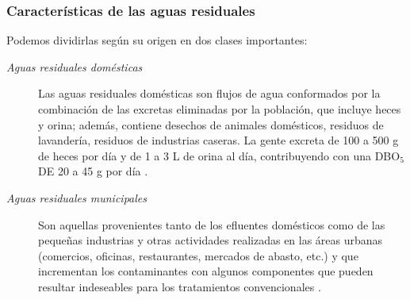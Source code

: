 \subsubsection*{Características de las aguas residuales}
Podemos dividirlas según su origen en dos clases importantes:
\begin{small}
\begin{description}
\item[\textit{Aguas residuales domésticas}]
Las aguas residuales domésticas son flujos de agua conformados por la combinación de las excretas eliminadas por la población, que incluye heces y orina; además, contiene desechos de animales domésticos, residuos de lavandería, residuos de industrias caseras. La gente excreta de 100 a 500 g de heces por día y de 1 a 3 L de orina al día, contribuyendo con una DBO$_{5}$ DE 20 a 45 g por día \emph{\citep{carreno17}}. 
\item[\textit{Aguas residuales municipales}]
Son aquellas provenientes tanto de los efluentes domésticos como de las pequeñas industrias y otras actividades realizadas en las áreas urbanas (comercios, oficinas, restaurantes, mercados de abasto, etc.) y que incrementan los contaminantes con algunos componentes que pueden resultar indeseables para los tratamientos convencionales \emph{\citep{carreno17}}.
\end{description}
\end{small}

